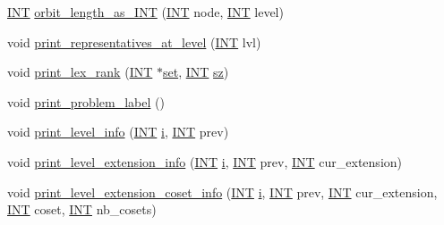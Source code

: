 \begin{DoxyCompactItemize}
\item 
\mbox{\hyperlink{galois_8h_a09fddde158a3a20bd2dcadb609de11dc}{I\+NT}} \mbox{\hyperlink{classgenerator_ad1925110f84924f3e3871f6f972cee4d}{orbit\+\_\+length\+\_\+as\+\_\+\+I\+NT}} (\mbox{\hyperlink{galois_8h_a09fddde158a3a20bd2dcadb609de11dc}{I\+NT}} node, \mbox{\hyperlink{galois_8h_a09fddde158a3a20bd2dcadb609de11dc}{I\+NT}} level)
\item 
void \mbox{\hyperlink{classgenerator_ad9d7823a4d09ba2a401a9ac2e4884f53}{print\+\_\+representatives\+\_\+at\+\_\+level}} (\mbox{\hyperlink{galois_8h_a09fddde158a3a20bd2dcadb609de11dc}{I\+NT}} lvl)
\item 
void \mbox{\hyperlink{classgenerator_ab89ba2cf2329ea137bcab9b5f38e9595}{print\+\_\+lex\+\_\+rank}} (\mbox{\hyperlink{galois_8h_a09fddde158a3a20bd2dcadb609de11dc}{I\+NT}} $\ast$\mbox{\hyperlink{nauty_8h_a9690bea211101f22a5e154087590c3da}{set}}, \mbox{\hyperlink{galois_8h_a09fddde158a3a20bd2dcadb609de11dc}{I\+NT}} \mbox{\hyperlink{classgenerator_ad7f9a92bb686f90239fd2ec3d4cbf42e}{sz}})
\item 
void \mbox{\hyperlink{classgenerator_a06d3c064ba84ebe8db3537e6273f16c3}{print\+\_\+problem\+\_\+label}} ()
\item 
void \mbox{\hyperlink{classgenerator_aeef1b9fe6115b67be42d7cb3206fddd2}{print\+\_\+level\+\_\+info}} (\mbox{\hyperlink{galois_8h_a09fddde158a3a20bd2dcadb609de11dc}{I\+NT}} \mbox{\hyperlink{alphabet2_8_c_acb559820d9ca11295b4500f179ef6392}{i}}, \mbox{\hyperlink{galois_8h_a09fddde158a3a20bd2dcadb609de11dc}{I\+NT}} prev)
\item 
void \mbox{\hyperlink{classgenerator_aa771f96ac28c2c79e029e3d66b3b2942}{print\+\_\+level\+\_\+extension\+\_\+info}} (\mbox{\hyperlink{galois_8h_a09fddde158a3a20bd2dcadb609de11dc}{I\+NT}} \mbox{\hyperlink{alphabet2_8_c_acb559820d9ca11295b4500f179ef6392}{i}}, \mbox{\hyperlink{galois_8h_a09fddde158a3a20bd2dcadb609de11dc}{I\+NT}} prev, \mbox{\hyperlink{galois_8h_a09fddde158a3a20bd2dcadb609de11dc}{I\+NT}} cur\+\_\+extension)
\item 
void \mbox{\hyperlink{classgenerator_a89c72f79f883c8b241c958c4c9107bc1}{print\+\_\+level\+\_\+extension\+\_\+coset\+\_\+info}} (\mbox{\hyperlink{galois_8h_a09fddde158a3a20bd2dcadb609de11dc}{I\+NT}} \mbox{\hyperlink{alphabet2_8_c_acb559820d9ca11295b4500f179ef6392}{i}}, \mbox{\hyperlink{galois_8h_a09fddde158a3a20bd2dcadb609de11dc}{I\+NT}} prev, \mbox{\hyperlink{galois_8h_a09fddde158a3a20bd2dcadb609de11dc}{I\+NT}} cur\+\_\+extension, \mbox{\hyperlink{galois_8h_a09fddde158a3a20bd2dcadb609de11dc}{I\+NT}} coset, \mbox{\hyperlink{galois_8h_a09fddde158a3a20bd2dcadb609de11dc}{I\+NT}} nb\+\_\+cosets)

\end{DoxyCompactItemize}
